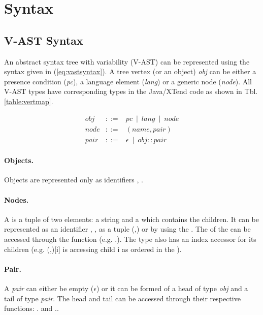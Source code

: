 \section{Syntax}

\subsection{V-AST Syntax}

An abstract syntax tree with variability (V-AST) can be represented using the syntax given in (\ref{eq:vastsyntax}). A tree vertex (or an object) \textit{obj} can be either a presence condition (\textit{pc}), a language element (\textit{lang}) or a generic node (\textit{node}). All V-AST types have corresponding types in the Java/XTend code as shown in Tbl.\,\ref{table:vertmap}.

\begin{equation}
\label{eq:vastsyntax}
\begin{array}{rcl}
obj & ::= & pc ~\mid~ lang ~\mid~ node
\\[0.5mm]
node & ::= & (name,pair)
\\[0.5mm]
pair & ::= & \epsilon ~\mid~ obj::pair
\end{array}
\end{equation}

\paragraph{Objects.} Objects are represented only as identifiers , .

\paragraph{Nodes.} A  is a tuple of two elements: a string  and a  which contains the children. It can be represented as an identifier ,  , as a tuple (,) or by using the  . The  of the  can be accessed through the function  (e.g. .). The  type also has an index accessor for its children (e.g. (,)[i] is accessing child i as ordered in the  ).

\paragraph{Pair.}  A \textit{pair} can either be empty ($\epsilon$) or it can be formed of a head of type \textit{obj} and a tail of type \textit{pair}. The head and tail can be accessed through their respective functions: . and ..

